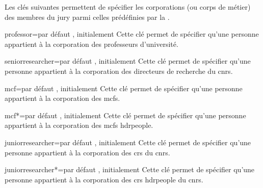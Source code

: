 Les clés suivantes\syntaxeoptions{} permettent de spécifier les corporations (ou
corps de métier) des membres du jury parmi celles prédéfinies par la \yatCl{}.

\begin{docKey}{professor}{=\textbar{}}{par défaut
    , initialement }
  Cette clé permet de spécifier qu'une personne appartient à la corporation des
  professeurs d'université.
\end{docKey}
%
\begin{docKey}{seniorresearcher}{=\textbar{}}{par
    défaut , initialement }
  Cette clé permet de spécifier qu'une personne appartient à la corporation des
  directeurs de recherche du \gls{cnrs}.
\end{docKey}
%
\begin{docKey}{mcf}{=\textbar{}}{par défaut
    , initialement }
  Cette clé permet de spécifier qu'une personne appartient à la corporation des
  \glspl{mcf}.
\end{docKey}
%
\begin{docKey}{mcf*}{=\textbar{}}{par défaut
    , initialement }
  Cette clé permet de spécifier qu'une personne appartient à la corporation des
  \glspl{mcf} \acrshort{hdrpeople}.
\end{docKey}
%
\begin{docKey}{juniorresearcher}{=\textbar{}}{par
    défaut , initialement }
  Cette clé permet de spécifier qu'une personne appartient à la corporation des
  \glspl{cr} du \gls{cnrs}.
\end{docKey}
%
\begin{docKey}{juniorresearcher*}{=\textbar{}}{par
    défaut , initialement }
  Cette clé permet de spécifier qu'une personne appartient à la corporation des
  \glspl{cr} \acrshort{hdrpeople} du \gls{cnrs}.
\end{docKey}
